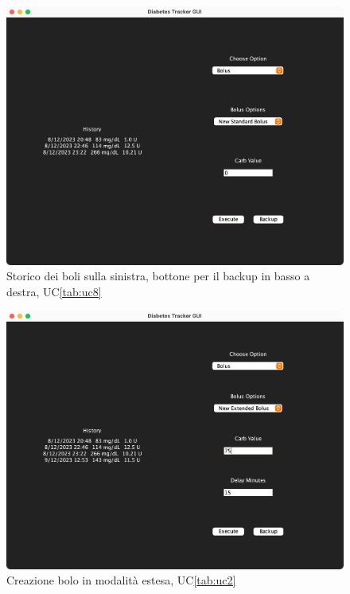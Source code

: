 \documentclass[twocolumn]{article}
\begin{document}
\null\vfill
\begin{figure}[!htbp]
    \centering
    \includegraphics[width=14cm]{gui-history.png}
    \caption{Storico dei boli sulla sinistra, bottone per il backup in basso a destra, UC\ref{tab:uc8}}
    \label{fig:gui-history}
\end{figure}
\vfill\null

\begin{figure}
    \centering
    \includegraphics[width=14cm]{gui-bolus-ext.png}
    \caption{Creazione bolo in modalità estesa, UC\ref{tab:uc2}}
    \label{fig:gui-bolus-ext}
\end{figure}
\end{document}
